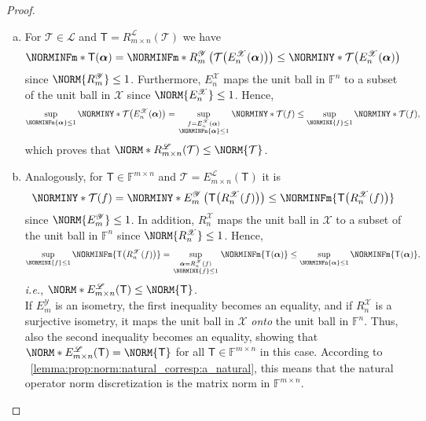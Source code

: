 \documentclass[a4paper]{paper}
\newcommand*{\SPC}[1]{{\ensuremath{\mathscr{#1}}}}
\newcommand*{\SPCL}{\SPC{L}}
\newcommand*{\SPCX}{\SPC{X}}
\newcommand{\FIELD}{{\ensuremath{\mathbb{F}}}}
\newcommand*{\Fn}{{\ensuremath{\FIELD^n}}}
\newcommand*{\Fmxn}{{\ensuremath{\FIELD^{m \times n}}}}
\newcommand*{\OP}[1]{{\ensuremath{\mathcal{#1}}}}
\newcommand*{\OPT}{\OP{T}}
\newcommand{\DISCOP}[1]{{\ensuremath{\mathsf{#1}}}}
\newcommand*{\DISCOPT}{\DISCOP{T}}
\newcommand*{\EXT}[2]{\ensuremath{E_{#1}^{#2}}}
\newcommand*{\REST}[2]{\ensuremath{R_{#1}^{#2}}}
\newcommand*{\RnX}{{\ensuremath{\REST{n}{\SPC{X}}}}}
\newcommand*{\RmY}{{\ensuremath{\REST{m}{\SPC{Y}}}}}
\newcommand*{\EnX}{{\ensuremath{\EXT{n}{\SPC{X}}}}}
\newcommand*{\EmY}{{\ensuremath{\EXT{m}{\SPC{Y}}}}}
\newcommand*{\STACK}[2]{\genfrac{}{}{0pt}{1}{#1}{#2}}
\newcommand{\ie}{\textsl{i.e.}\xspace}
\newcommand{\valpha}{\boldsymbol{\alpha}}
\begin{document}
\begin{proof}~
 \begin{enumerate}[(a)]
  \item For $\OPT \in \SPCL$ and $\DISCOPT = \REST{m\times n}{\SPCL}(\OPT)$ we have
  \begin{equation*}
   \NORMINFm*{\DISCOPT(\valpha)} = \NORMINFm*{\RmY \left( \OPT\big( \EnX(\valpha) \big) \right)}
   \leq \NORMINY*{\OPT\big( \EnX(\valpha) \big)}
  \end{equation*}
  since $\NORM{\RmY} \leq 1$. Furthermore, $\EnX$ maps the unit ball in $\Fn$ to a subset of the unit ball in
  $\SPCX$ since $\NORM{\EnX} \leq 1$. Hence,
  \begin{equation*}
   \sup_{\NORMINFn{\valpha} \leq 1} \NORMINY*{\OPT\big( \EnX(\valpha) \big)}
   = \sup_{\STACK{f=\EnX(\valpha)}{\NORMINFn{\valpha} \leq 1}} \NORMINY*{\OPT(f)}
   \leq \sup_{\NORMINX{f} \leq 1} \NORMINY*{\OPT(f)},
  \end{equation*}
  which proves that $\NORM*{\REST{m\times n}{\SPCL}(\OPT)} \leq \NORM{\OPT}$.

  \item Analogously, for $\DISCOPT \in \Fmxn$ and $\OPT = \EXT{m\times n}{\SPCL}(\DISCOPT)$ it is
  \begin{equation*}
   \NORMINY*{\OPT(f)} = \NORMINY*{\EmY \left( \DISCOPT\big( \RnX(f) \big) \right)}
   \leq \NORMINFm{\DISCOPT\big( \RnX(f) \big)}
  \end{equation*}
  since $\NORM{\EmY} \leq 1$. In addition, $\RnX$ maps the unit ball in $\SPCX$ to a subset of the unit 
  ball in $\Fn$ since $\NORM{\RnX} \leq 1$. Hence,
  \begin{equation*}
   \sup_{\NORMINX{f} \leq 1} \NORMINFm{\DISCOPT\big( \RnX(f) \big)}
   = \sup_{\STACK{\valpha=\RnX(f)}{\NORMINX{f} \leq 1}} \NORMINFm{\DISCOPT(\valpha)}
   \leq \sup_{\NORMINFn{\valpha} \leq 1} \NORMINFm{\DISCOPT(\valpha)},
  \end{equation*}
  \ie, $\NORM*{E_{m\times n}^{\SPCL}(\DISCOPT)} \leq \NORM{\DISCOPT}$.\\[1em]
  If $\EmY$ is an isometry, the first inequality becomes an equality, and if $\RnX$ is a surjective isometry, it maps
  the unit ball in $\SPCX$ \emph{onto} the unit ball in $\Fn$. Thus, also the second inequality becomes an 
  equality, showing that $\NORM*{\EXT{m\times n}{\SPCL}(\DISCOPT)} = \NORM{\DISCOPT}$ for all 
  $\DISCOPT \in \Fmxn$ in this case. According to 
  ~\eqref{lemma:prop:norm:natural_corresp:a_natural}, this means that the natural 
  operator norm discretization is the matrix norm in $\Fmxn$.
 \end{enumerate}
\end{proof}
\end{document}
